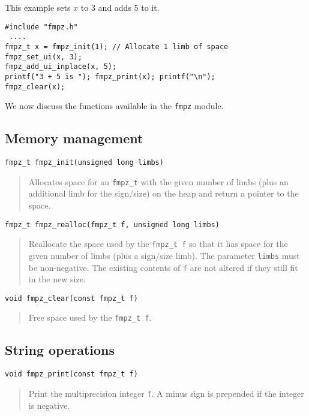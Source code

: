 \documentclass[a4paper,10pt]{article}
\newcommand{\code}{\lstinline}
\begin{document}
This example sets $x$ to 3 and adds 5 to it.

\begin{lstlisting}
#include "fmpz.h"
 ....
fmpz_t x = fmpz_init(1); // Allocate 1 limb of space
fmpz_set_ui(x, 3);
fmpz_add_ui_inplace(x, 5);
printf("3 + 5 is "); fmpz_print(x); printf("\n");
fmpz_clear(x);
\end{lstlisting}

We now discuss the functions available in the \code{fmpz} module.

\subsection{Memory management}

\begin{lstlisting}
fmpz_t fmpz_init(unsigned long limbs) 
\end{lstlisting}
\begin{quote}
Allocates space for an \code{fmpz_t} with the given number of limbs (plus an additional limb for the sign/size) on the heap and return a pointer to the space.
\end{quote}

\begin{lstlisting}
fmpz_t fmpz_realloc(fmpz_t f, unsigned long limbs)
\end{lstlisting}
\begin{quote}
Reallocate the space used by the \code{fmpz_t f} so that it has space for the given number of limbs (plus a sign/size limb). The parameter \code{limbs} must be non-negative. The existing contents of \code{f} are not altered if they still fit in the new size.
\end{quote}

\begin{lstlisting}
void fmpz_clear(const fmpz_t f)
\end{lstlisting}
\begin{quote}
Free space used by the \code{fmpz_t f}.
\end{quote}

\subsection{String operations}

\begin{lstlisting}
void fmpz_print(const fmpz_t f)
\end{lstlisting}
\begin{quote}
Print the multiprecision integer \code{f}. A minus sign is prepended if the integer is negative.
\end{quote}
\end{document}
